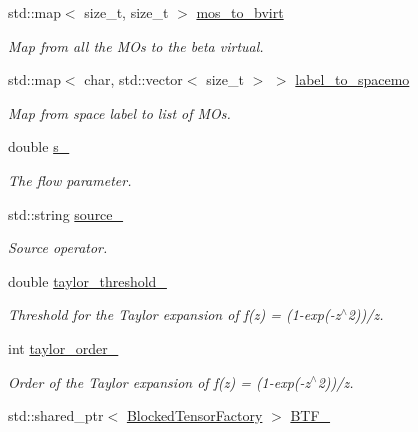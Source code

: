 \begin{DoxyCompactItemize}
std\+::map$<$ size\+\_\+t, size\+\_\+t $>$ \mbox{\hyperlink{classforte_1_1_m_r_d_s_r_g___s_o_a0b5860965b23b4357c9bcc6bd74ee60b}{mos\+\_\+to\+\_\+bvirt}}
\begin{DoxyCompactList}\small\item\em Map from all the M\+Os to the beta virtual. \end{DoxyCompactList}\item 
std\+::map$<$ char, std\+::vector$<$ size\+\_\+t $>$ $>$ \mbox{\hyperlink{classforte_1_1_m_r_d_s_r_g___s_o_a994355c8aef171eaba4dc1a75815874a}{label\+\_\+to\+\_\+spacemo}}
\begin{DoxyCompactList}\small\item\em Map from space label to list of M\+Os. \end{DoxyCompactList}\item 
double \mbox{\hyperlink{classforte_1_1_m_r_d_s_r_g___s_o_a8f3c22f8a7b282b1dbfa8a79cf04b723}{s\+\_\+}}
\begin{DoxyCompactList}\small\item\em The flow parameter. \end{DoxyCompactList}\item 
std\+::string \mbox{\hyperlink{classforte_1_1_m_r_d_s_r_g___s_o_a998d65a5bfebbfcf7d551160eda5cbb8}{source\+\_\+}}
\begin{DoxyCompactList}\small\item\em Source operator. \end{DoxyCompactList}\item 
double \mbox{\hyperlink{classforte_1_1_m_r_d_s_r_g___s_o_a058d2eeac12a70a5176e414566d41daf}{taylor\+\_\+threshold\+\_\+}}
\begin{DoxyCompactList}\small\item\em Threshold for the Taylor expansion of f(z) = (1-\/exp(-\/z$^\wedge$2))/z. \end{DoxyCompactList}\item 
int \mbox{\hyperlink{classforte_1_1_m_r_d_s_r_g___s_o_abdf539f3d60ce6c0f59570607415a1c4}{taylor\+\_\+order\+\_\+}}
\begin{DoxyCompactList}\small\item\em Order of the Taylor expansion of f(z) = (1-\/exp(-\/z$^\wedge$2))/z. \end{DoxyCompactList}\item 
std\+::shared\+\_\+ptr$<$ \mbox{\hyperlink{classforte_1_1_blocked_tensor_factory}{Blocked\+Tensor\+Factory}} $>$ \mbox{\hyperlink{classforte_1_1_m_r_d_s_r_g___s_o_ab4ed996af363a9cffadaa3c05a68e8b3}{B\+T\+F\+\_\+}}

\end{DoxyCompactItemize}
